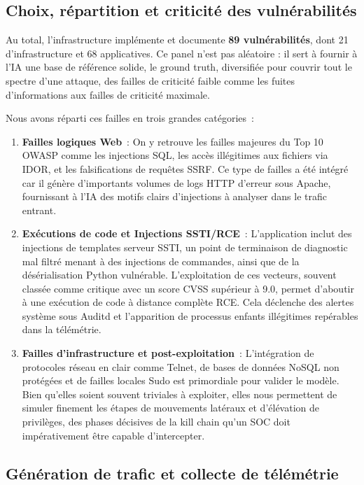 \documentclass[runningheads]{llncs}
\begin{document}
\subsection{Choix, répartition et criticité des vulnérabilités}

Au total, l'infrastructure implémente et documente \textbf{89 vulnérabilités}, dont 21 d'infrastructure et 68 applicatives. Ce panel n'est pas aléatoire : il sert à fournir à l'IA une base de référence solide, le ground truth, diversifiée pour couvrir tout le spectre d'une attaque, des failles de criticité faible comme les fuites d'informations aux failles de criticité maximale.

Nous avons réparti ces failles en trois grandes catégories~:
\begin{enumerate}
    \item \textbf{Failles logiques Web}~: On y retrouve les failles majeures du Top 10 OWASP comme les injections SQL, les accès illégitimes aux fichiers via IDOR, et les falsifications de requêtes SSRF. Ce type de failles a été intégré car il génère d'importants volumes de logs HTTP d'erreur sous Apache, fournissant à l'IA des motifs clairs d'injections à analyser dans le trafic entrant.
    \item \textbf{Exécutions de code et Injections SSTI/RCE}~: L'application inclut des injections de templates serveur SSTI, un point de terminaison de diagnostic mal filtré menant à des injections de commandes, ainsi que de la désérialisation Python vulnérable. L'exploitation de ces vecteurs, souvent classée comme critique avec un score CVSS supérieur à 9.0, permet d'aboutir à une exécution de code à distance complète RCE. Cela déclenche des alertes système sous Auditd et l'apparition de processus enfants illégitimes repérables dans la télémétrie.
    \item \textbf{Failles d'infrastructure et post-exploitation}~: L'intégration de protocoles réseau en clair comme Telnet, de bases de données NoSQL non protégées et de failles locales Sudo est primordiale pour valider le modèle. Bien qu'elles soient souvent triviales à exploiter, elles nous permettent de simuler finement les étapes de mouvements latéraux et d'élévation de privilèges, des phases décisives de la kill chain qu'un SOC doit impérativement être capable d'intercepter.
\end{enumerate}

\subsection{Génération de trafic et collecte de télémétrie}
\end{document}
